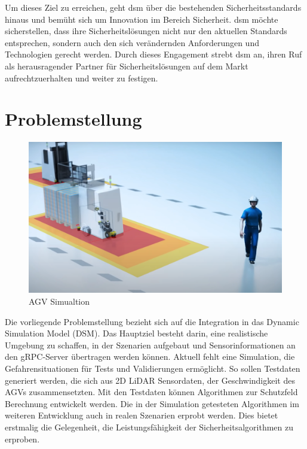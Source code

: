 Um dieses Ziel zu erreichen, geht \ac{dsm} über die bestehenden Sicherheitsstandards hinaus und bemüht sich um Innovation im Bereich Sicherheit. \ac{dsm} möchte sicherstellen, dass ihre Sicherheitslösungen nicht nur den aktuellen Standards entsprechen, sondern auch den sich verändernden Anforderungen und Technologien gerecht werden. Durch dieses Engagement strebt \ac{dsm} an, ihren Ruf als herausragender Partner für Sicherheitslösungen auf dem Markt aufrechtzuerhalten und weiter zu festigen.


\section{Problemstellung}
\begin{figure}[htp]
    \centering
    \includegraphics[width=(\textwidth)/2]{images/AGV_Show.png}
    \caption{AGV Simualtion}
    \label{fig:AGV}
\end{figure}
Die vorliegende Problemstellung bezieht sich auf die Integration in das Dynamic Simulation Model (DSM). Das Hauptziel besteht darin, eine realistische Umgebung zu schaffen, in der Szenarien aufgebaut und Sensorinformationen an den gRPC-Server übertragen werden können. Aktuell fehlt eine Simulation, die Gefahrensituationen für Tests und Validierungen ermöglicht. So sollen Testdaten generiert werden, die sich aus 2D LiDAR Sensordaten, der Geschwindigkeit des AGVs zusammensetzten. Mit den Testdaten können Algorithmen zur Schutzfeld Berechnung entwickelt werden.
Die in der Simulation getesteten Algorithmen im weiteren Entwicklung auch in realen Szenarien erprobt werden. Dies bietet erstmalig die Gelegenheit, die Leistungsfähigkeit der Sicherheitsalgorithmen zu erproben.

